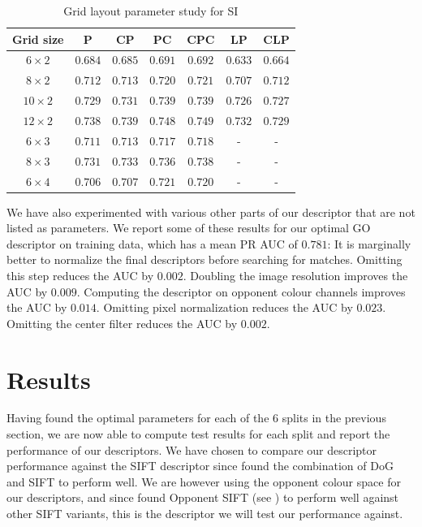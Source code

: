 \documentclass[thesis.tex]{subfiles}
\begin{document}
%
\begin{table}[tb]
\centering
\begin{tabular}{ c c c c c c c }
\toprule
Grid size & P & CP & PC & CPC & LP & CLP \\ \midrule
$6 \times 2$ & $0.684$ & $0.685$ & $0.691$ & $0.692$ & $0.633$ & $0.664$ \\ 
$8 \times 2$ & $0.712$ & $0.713$ & $0.720$ & $0.721$ & $0.707$ & $0.712$ \\ 
$10 \times 2$ & $0.729$ & $0.731$ & $0.739$ & $0.739$ & $0.726$ & $0.727$ \\ 
$12 \times 2$ & $0.738$ & $0.739$ & $0.748$ & $\mathbf{0.749}$ & $0.732$ & $0.729$ \\ 
$6 \times 3$ & $0.711$ & $0.713$ & $0.717$ & $0.718$ & - & - \\ 
$8 \times 3$ & $0.731$ & $0.733$ & $0.736$ & $0.738$ & - & - \\ 
$6 \times 4$ & $0.706$ & $0.707$ & $0.721$ & $0.720$ & - & - \\
\bottomrule
\end{tabular}
\caption{Grid layout parameter study for SI}
\label{tbl:dtuLayoutParametersSi}
\end{table}
%
We have also experimented with various other parts of our descriptor that are not listed as parameters. We report some of these results for our optimal GO descriptor on training data, which has a mean PR AUC of $0.781$: It is marginally better to normalize the final descriptors before searching for matches. Omitting this step reduces the AUC by $0.002$. Doubling the image resolution improves the AUC by $0.009$. Computing the descriptor on opponent colour channels improves the AUC by $0.014$. Omitting pixel normalization reduces the AUC by $0.023$. Omitting the center filter reduces the AUC by $0.002$.
%
\section{Results}
%
Having found the optimal parameters for each of the 6 splits in the previous section, we are now able to compute test results for each split and report the performance of our descriptors.
We have chosen to compare our descriptor performance against the SIFT descriptor since \citet{dahl2011finding} found the combination of DoG and SIFT to perform well. We are however using the opponent colour space for our descriptors, and since \citet{dahl2012interest} found Opponent SIFT (see ) to perform well against other SIFT variants, this is the descriptor we will test our performance against.
\end{document}
